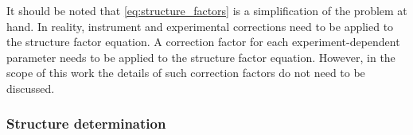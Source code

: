 It should be noted that \cref{eq:structure_factors} is a simplification of the problem at hand. In reality, instrument and experimental corrections need to be applied to the structure factor equation. A correction factor for each experiment-dependent parameter needs to be applied to the structure factor equation. However, in the scope of this work the details of such correction factors do not need to be discussed.

\subsubsection{Structure determination}

